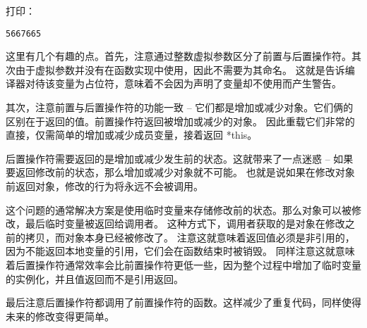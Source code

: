 \documentclass[../../LearnCpp.tex]{subfiles}
\begin{document}
打印：

\begin{lstlisting}
5667665
\end{lstlisting}

这里有几个有趣的点。首先，注意通过整数虚拟参数区分了前置与后置操作符。其次由于虚拟参数并没有在函数实现中使用，因此不需要为其命名。
这就是告诉编译器对待该变量为占位符，意味着不会因为声明了变量却不使用而产生警告。

其次，注意前置与后置操作符的功能一致 -- 它们都是增加或减少对象。它们俩的区别在于返回的值。前置操作符返回被增加或减少的对象。
因此重载它们非常的直接，仅需简单的增加或减少成员变量，接着返回 *this。

后置操作符需要返回的是增加或减少发生前的状态。这就带来了一点迷惑 -- 如果要返回修改前的状态，那么增加或减少对象就不可能。
也就是说如果在修改对象前返回对象，修改的行为将永远不会被调用。

这个问题的通常解决方案是使用临时变量来存储修改前的状态。那么对象可以被修改，最后临时变量被返回给调用者。
这种方式下，调用者获取的是对象在修改之前的拷贝，而对象本身已经被修改了。
注意这就意味着返回值必须是非引用的，因为不能返回本地变量的引用，它们会在函数结束时被销毁。
同样注意这就意味着后置操作符通常效率会比前置操作符更低一些，因为整个过程中增加了临时变量的实例化，并且值返回而不是引用返回。

最后注意后置操作符都调用了前置操作符的函数。这样减少了重复代码，同样使得未来的修改变得更简单。
\end{document}
